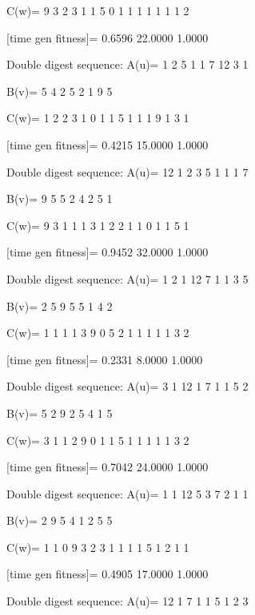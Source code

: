 C(w)=
     9     3     2     3     1     1     5     0     1     1     1     1     1     1     1     2

[time gen fitness]=
    0.6596   22.0000    1.0000

Double digest sequence:
A(u)=
     1     2     5     1     1     7    12     3     1

B(v)=
     5     4     2     5     2     1     9     5

C(w)=
     1     2     2     3     1     0     1     1     5     1     1     1     9     1     3     1

[time gen fitness]=
    0.4215   15.0000    1.0000

Double digest sequence:
A(u)=
    12     1     2     3     5     1     1     1     7

B(v)=
     9     5     5     2     4     2     5     1

C(w)=
     9     3     1     1     1     3     1     2     2     1     1     0     1     1     5     1

[time gen fitness]=
    0.9452   32.0000    1.0000

Double digest sequence:
A(u)=
     1     2     1    12     7     1     1     3     5

B(v)=
     2     5     9     5     5     1     4     2

C(w)=
     1     1     1     1     3     9     0     5     2     1     1     1     1     1     3     2

[time gen fitness]=
    0.2331    8.0000    1.0000

Double digest sequence:
A(u)=
     3     1    12     1     7     1     1     5     2

B(v)=
     5     2     9     2     5     4     1     5

C(w)=
     3     1     1     2     9     0     1     1     5     1     1     1     1     1     3     2

[time gen fitness]=
    0.7042   24.0000    1.0000

Double digest sequence:
A(u)=
     1     1    12     5     3     7     2     1     1

B(v)=
     2     9     5     4     1     2     5     5

C(w)=
     1     1     0     9     3     2     3     1     1     1     1     5     1     2     1     1

[time gen fitness]=
    0.4905   17.0000    1.0000

Double digest sequence:
A(u)=
    12     1     7     1     1     5     1     2     3

